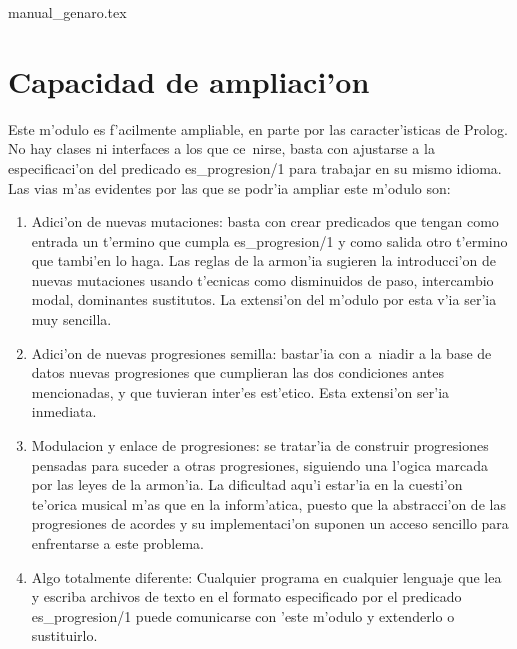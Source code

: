 ﻿manual_genaro.tex\documentclass[a4paper,12pt]{article}
\begin{document}
\section {Capacidad de ampliaci'on}
Este m'odulo es f'acilmente ampliable, en parte por las caracter'isticas de Prolog. No hay clases ni interfaces a los que ce~nirse, basta con ajustarse a la especificaci'on del predicado es\_progresion/1 para trabajar en su mismo idioma. Las vias m'as evidentes por las que se podr'ia ampliar este m'odulo son:
        \begin{enumerate}
        \item Adici'on de nuevas mutaciones: basta con crear predicados que tengan como entrada un t'ermino que cumpla es\_progresion/1 y como salida otro t'ermino que tambi'en lo haga. Las reglas de la armon'ia sugieren la introducci'on de nuevas mutaciones usando t'ecnicas como disminuidos de paso, intercambio modal, dominantes sustitutos. La extensi'on del m'odulo por esta v'ia ser'ia muy sencilla.
        \item Adici'on de nuevas progresiones semilla: bastar'ia con a~niadir a la base de datos nuevas progresiones que cumplieran las dos condiciones antes mencionadas, y que tuvieran inter'es est'etico. Esta extensi'on ser'ia inmediata.
        \item Modulacion y enlace de progresiones: se tratar'ia de construir progresiones pensadas para suceder a otras progresiones, siguiendo una l'ogica marcada por las leyes de la armon'ia. La dificultad aqu'i estar'ia en la cuesti'on te'orica musical m'as que en la inform'atica, puesto que la abstracci'on de las progresiones de acordes y su implementaci'on suponen un acceso sencillo para enfrentarse a este problema.
        \item Algo totalmente diferente: Cualquier programa en cualquier lenguaje que lea y escriba archivos de texto en el formato especificado por el predicado es\_progresion/1 puede comunicarse con 'este m'odulo y extenderlo o sustituirlo.
        \end{enumerate}
\end{document}
